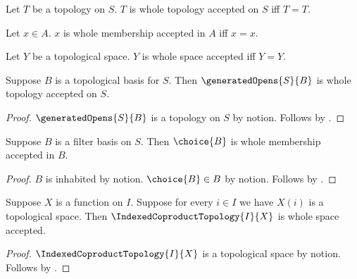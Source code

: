 




\begin{definition}\label{whole_topology_consumer}
    Let $T$ be a topology on $S$.
    $T$ is whole topology accepted on $S$ iff $T=T$.
\end{definition}

\begin{definition}\label{whole_membership_consumer}
    Let $x\in A$.
    $x$ is whole membership accepted in $A$ iff $x=x$.
\end{definition}

\begin{definition}\label{whole_space_consumer}
    Let $Y$ be a topological space.
    $Y$ is whole space accepted iff $Y=Y$.
\end{definition}

\begin{proposition}\label{whole_basis_generated_opens}
    Suppose $B$ is a topological basis for $S$.
    Then $\generatedOpens{S}{B}$ is whole topology accepted on $S$.
\end{proposition}
\begin{proof}
    $\generatedOpens{S}{B}$ is a topology on $S$ by notion.
    Follows by .
\end{proof}

\begin{proposition}\label{whole_filter_basis_choice}
    Suppose $B$ is a filter basis on $S$.
    Then $\choice{B}$ is whole membership accepted in $B$.
\end{proposition}
\begin{proof}
    $B$ is inhabited by notion.
    $\choice{B}\in B$ by notion.
    Follows by .
\end{proof}

\begin{proposition}\label{whole_function_on_coproduct}
    Suppose $X$ is a function on $I$.
    Suppose for every $i\in I$ we have $X(i)$ is a topological space.
    Then $\IndexedCoproductTopology{I}{X}$ is whole space accepted.
\end{proposition}
\begin{proof}
    $\IndexedCoproductTopology{I}{X}$ is a topological space by notion.
    Follows by .
\end{proof}
